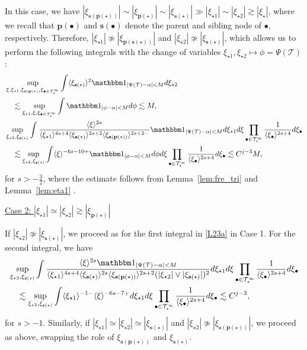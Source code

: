 \documentclass[%
11pt,  reqno]{amsart}
\newcommand{\5}{\textup{V}}
\newcommand{\noi}{\noindent}
\newcommand{\ind}{\mathbbm 1}
\newcommand{\les}{\lesssim}
\theoremstyle{remark}
\newcommand{\bul}{\bullet}
\newcommand{\TT}{\mathcal{T}}
\newcommand{\al}{\alpha}
\newcommand{\pb}{\mathbf{p}}
\newcommand{\sbf}{\mathbf{s}}
\newcommand{\ges}{\gtrsim}
\newcommand{\jb}[1]
{\langle #1 \rangle}
\numberwithin{equation}{section}
\numberwithin{theorem}{section}
\begin{document}
In this case, we have $|\xi_{\sbf(\pb(\star))}| \sim |\xi_{\pb(\star)}| \sim |\xi_{\sbf(\star)}| \gg |\xi_{\star1}| \sim |\xi_{\star2}| \ges |\xi_\star|$, where we recall that $\pb(\bul)$ and $\sbf(\bul)$ denote the parent and sibling node of $\bul$, respectively. Therefore, $|\xi_{\star1}| \not \simeq |\xi_{\pb(\sbf(\star))}| $ and $|\xi_{\star2}| \not \simeq |\xi_{\sbf(\star)}|$, which allows us to perform the following integrals with the change of variables $\xi_{\star1}, \xi_{\star2} \mapsto \phi = \Psi(\TT)$:
\begin{align}\label{L23a}
    & \sup_{ \xi,\xi_{\star1}, \xi_{\sbf(\pb(\star))} \xi_{\bul\in \TT^\infty_\star}} 
    \int 
    \jb{\xi_{\sbf(\star)}}^2 
    \ind_{|\Psi(\TT)-\al|< M } 
    d\xi_{\star2} 
    \\
    &
    \quad 
    \les 
    \sup_{\xi_{\star1}, \xi, \xi_{\bul\in \TT^\infty_\star}} 
    \int 
    \ind_{|\phi-\al|  < M} d\phi 
    \les M
    , 
    \\
    &
    \sup_{\xi_{\star2}, \xi_{\sbf(\star)}} 
    \int 
    \frac{\jb{\xi}^{2s}   }{ \jb{\xi_{\star1}}^{4s+4} \jb{\xi_{\sbf(\star)}}^{2s+2} \jb{\xi_{\sbf(\pb(\star))}}^{2s+2-} }
    \ind_{|\Psi(\TT)-\al|< M } 
    d\xi_{\star1} d\xi 
    \prod_{\bul\in\TT^\infty_\star} \frac{1}{\jb{\xi_\bul}^{2s+4}} d\xi_\bul
    \\
    &
    \quad 
    \les 
    \sup_{\xi_{\star2}, \xi_{\sbf(\star)}} 
    \int \jb{\xi}^{-6s-10+} \ind_{|\phi-\al|< M} d\phi d\xi \prod_{\bul\in\TT^\infty_\star} \frac{1}{\jb{\xi_\bul}^{2s+4}} d\xi_\bul
    \les C^{j-3 } M 
    ,
\end{align}
for $s>-\frac32$, where the estimate follows from Lemma~\ref{lem:fre_tri} and Lemma~\ref{lem:eta1}
.


\smallskip
\noi
\underline{Case 2: $|\xi_{\star1}| \simeq |\xi_{\star2}| \ges |\xi_{\pb(\star)}|$}

If $|\xi_{\star2}| \not\simeq |\xi_{\sbf(\star)}|$, we proceed as for the first integral in \eqref{L23a} in Case 1. For the second integral, we have
\begin{align}\label{L23b}
&
    \sup_{\xi_{\star2}, \xi_{\sbf(\star)}} 
    \int 
    \frac{\jb{\xi}^{2s} \ind_{|\Psi(\TT)-\al|< M }   }{ \jb{\xi_{\star1}}^{4s+4} \jb{\xi_{\sbf(\star)}}^{2s} \jb{\xi_{\sbf(\pb(\star))}}^{2s+2} (|\xi_{\star2}| \lor |\xi_{\sbf(\star)}|)^2  }
    d\xi_{\star1} d\xi 
    \prod_{\bul\in\TT^\infty_\star} \frac{1}{\jb{\xi_\bul}^{2s+4}} d\xi_\bul
    \\
    &
    \quad 
    \les 
    \sup_{\xi_{\star2}, \xi_{\sbf(\star)}} 
    \int \jb{\xi_{\star1}}^{-1-} \jb{\xi}^{-6s-7+} d\xi_{\star1} d\xi \prod_{\bul\in\TT^\infty_\star} \frac{1}{\jb{\xi_\bul}^{2s+4}} d\xi_\bul
    \les C^{j-3 } , 
\end{align}
for $s> -1$. 
% 
% 
Similarly, if $|\xi_{\star1}| \simeq |\xi_{\star2}| \simeq |\xi_{\sbf(\star)}|$ and $|\xi_{\star2}| \not\simeq |\xi_{\sbf(\pb(\star))}|$, we proceed as above, swapping the role of $\xi_{\sbf(\pb(\star))}$ and $\xi_{\sbf(\star)}$. 
\end{document}
